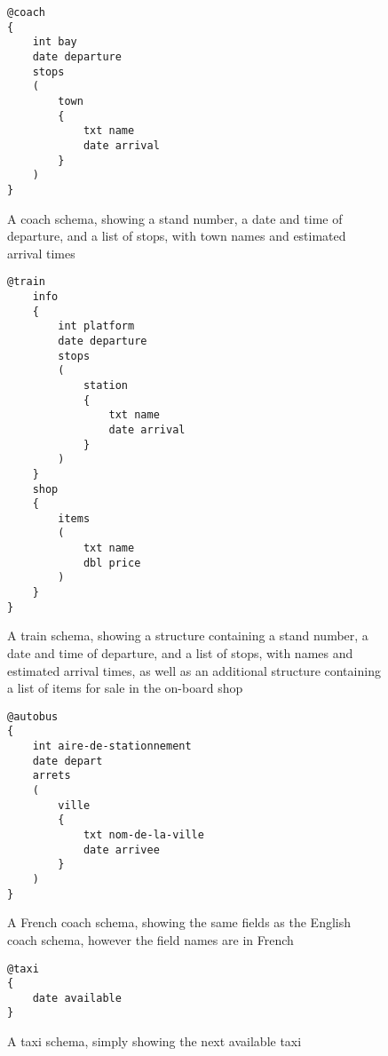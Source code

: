 \begin{figure}[h]
\begin{lstlisting}
@coach
{
    int bay
    date departure
    stops
    (
    	town
    	{
    		txt name
    		date arrival
    	}
    )
}
\end{lstlisting}
\caption[Example Schema for a Coach]{A coach schema, showing a stand number, a date and time of departure, and a list of stops, with town names and estimated arrival times}
\label{fig:coach-schema}
\end{figure}

\begin{figure}[h]
\begin{lstlisting}
@train
	info
	{
		int platform
		date departure
		stops
		(
			station
			{
				txt name
				date arrival
			}
		)
	}
	shop
	{
		items
		(
			txt name
			dbl price
		)
	}
}
\end{lstlisting}
\caption[Example Schema for a Train]{A train schema, showing a structure containing a stand number, a date and time of departure, and a list of stops, with names and estimated arrival times, as well as an additional structure containing a list of items for sale in the on-board shop}
\label{fig:train-schema}
\end{figure}


\begin{figure}[h]
\begin{lstlisting}
@autobus
{
    int aire-de-stationnement
    date depart
    arrets
    (
    	ville
    	{
    		txt nom-de-la-ville
    		date arrivee
    	}
    )
}
\end{lstlisting}
\caption[Example Schema for a French Coach]{A French coach schema, showing the same fields as the English coach schema, however the field names are in French}
\label{fig:french-coach-schema}
\end{figure}

\begin{figure}[h]
\begin{lstlisting}
@taxi
{
	date available
}
\end{lstlisting}
\caption[Example Schema for a Taxi]{A taxi schema, simply showing the next available taxi}
\label{fig:taxi-schema}
\end{figure}

